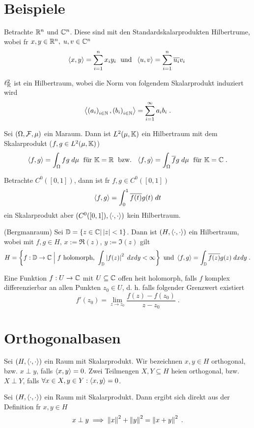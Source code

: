 \section{Beispiele}
\begin{ex}
	Betrachte \(\mathbb{R}^n\) und \(\mathbb{C}^n\). Diese sind mit den Standardskalarprodukten Hilbertr\as ume, wobei f\us r \(x, y \in \mathbb{R}^n,\; u,v \in \mathbb{C}^n\)
	\[\left\langle x,y\right\rangle = \sum_{i=1}^n x_i y_i \;\text{ und }\; \left\langle u,v\right\rangle = \sum_{i=1}^n \overline{u_i}v_i\;\]
\end{ex}
\begin{ex}
	\(\ell^2_{\mathbb{K}}\) ist ein Hilbertraum, wobei die Norm von folgendem Skalarprodukt induziert wird
	\[\left\langle\left (a_i\right )_{i\in \mathbb{N}}, \left (b_i\right )_{i\in \mathbb{N}}\right\rangle = \sum_{i=1}^\infty a_i b_i\;.\]
\end{ex}

\begin{ex}
	Sei \((\Omega, \mathcal{F}, \mu)\) ein Ma\s raum. Dann ist \(L^2(\mu, \mathbb{K})\) ein Hilbertraum mit dem Skalarprodukt (\(f,g \in L^2(\mu,\mathbb{K})\))
	\[ \left\langle f,g\right\rangle = \int_\Omega f g \;d\mu \;\text{ f{\"u}r } \mathbb{K} = \mathbb{R} \;\text{ bzw. }\; \left\langle f,g\right\rangle = \int_\Omega \overline{f}g \;d\mu \;\text{ f{\"u}r }\mathbb{K} = \mathbb{C}\;.\] 
\end{ex}

\begin{ex}
	Betrachte \(C^0([0,1])\), dann ist f\us r \(f,g\in C^0([0,1])\)
	\[ \left\langle f,g\right\rangle = \int_0^1 \overline{f(t)} g(t) \; dt\]
	ein Skalarprodukt aber \((C^0([0,1]), \left\langle\cdot,\cdot\right\rangle)\) kein Hilbertraum.
	\end{ex}
	
\begin{ex}(Bergmanraum)
	Sei \(\mathbb{D} = \left\{z \in\mathbb{C} \vert \left\lvert z \right\rvert < 1\right\}\). Dann ist \((H, \left\langle\cdot, \cdot\right\rangle)\) ein Hilbertraum, wobei mit \(f,g \in H\), \(x:= \Re(z)\), \(y:= \Im(z)\) gilt
	\[H = \left\{f:\mathbb{D} \to \mathbb{C} \;\Big\vert\; f \text{ holomorph, } \int_\mathbb{D} \left\lvert f(z) \right\rvert^2 \;dxdy < \infty\right\} \text{ und } \left\langle f,g\right\rangle = \int_\mathbb{D} \overline{f(z)} g(z)\; dx dy\;.\]
\end{ex}
\begin{rem}
	Eine Funktion \(f: U \to \mathbb{C}\) mit \(U\subseteq \mathbb{C}\) offen  hei\s t holomorph, falls $f$ komplex differenzierbar an allen Punkten \(z_0 \in U\), d. h. falls folgender Grenzwert existiert 
	\[f'(z_0) = \lim_{z\to z_0} \frac{f(z) - f(z_0)}{z-z_0}\;.\]
\end{rem}

\section{Orthogonalbasen}
\begin{definition}
	Sei \((H, \left\langle\cdot, \cdot\right\rangle)\) ein Raum mit Skalarprodukt. Wir bezeichnen \(x,y \in H\) orthogonal, bzw. \(x\perp y\), falls \(\left\langle x,y\right\rangle = 0\). Zwei Teilmengen \(X, Y \subseteq H\) hei\s en orthogonal, bzw. \(X \perp Y\), falls \(\forall x \in X, y \in Y: \left\langle x,y\right\rangle = 0\).
\end{definition}
\begin{lemma}
	Sei \((H, \left\langle\cdot, \cdot\right\rangle)\) ein Raum mit Skalarprodukt. Dann ergibt sich direkt aus der Definition f\us r \(x,y\in H\)
	\[x \perp y \implies \left\lVert x\right\rVert^2 + \left\lVert y\right\rVert^2 = \left\lVert x+y\right\rVert^2\;.\]
\end{lemma}

